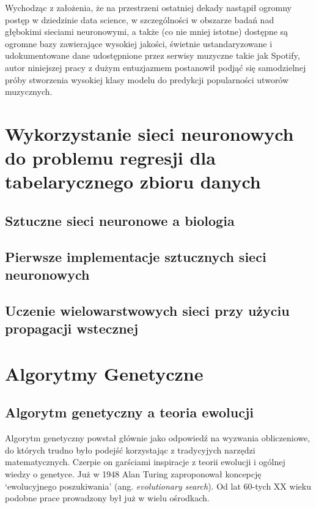 \documentclass[a4paper,11pt]{article}
\begin{document}
    \bigskip

    Wychodząc z założenia, że na przestrzeni ostatniej dekady nastąpił ogromny postęp w dziedzinie data science, w szczególności w obszarze badań nad głębokimi sieciami neuronowymi, a także (co nie mniej istotne) dostępne są ogromne bazy zawierające wysokiej jakości, świetnie ustandaryzowane i udokumentowane dane udostępnione przez serwisy muzyczne takie jak Spotify, autor niniejszej pracy z dużym entuzjazmem postanowił podjąć się samodzielnej próby stworzenia wysokiej klasy modelu do predykcji popularności utworów muzycznych.


    \section{Wykorzystanie sieci neuronowych do problemu regresji dla tabelarycznego zbioru danych}

    \subsection{Sztuczne sieci neuronowe a biologia}

    \subsection{Pierwsze implementacje sztucznych sieci neuronowych}

    \subsection{Uczenie wielowarstwowych sieci przy użyciu propagacji wstecznej}


    \section{Algorytmy Genetyczne}

    \subsection{Algorytm genetyczny a teoria ewolucji}

    Algorytm genetyczny powstał głównie jako odpowiedź na wyzwania obliczeniowe, do których trudno było podejść korzystając z tradycyjych narzędzi matematycznych. Czerpie on garściami inspiracje z teorii ewolucji i ogólnej wiedzy o genetyce. Już w 1948 Alan Turing zaproponował koncepcję `ewolucyjnego poszukiwania' (ang. \textit{evolutionary search}). Od lat 60-tych XX wieku podobne prace prowadzony był już w wielu ośrodkach\cite{IntroductionToEvolutionaryComputing2015}.
\end{document}
